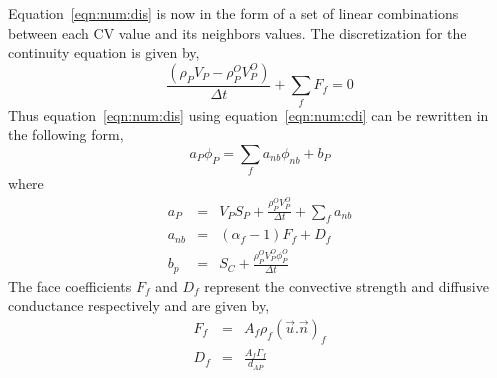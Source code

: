 Equation~\eqref{eqn:num:dis} is now in the form of a set of linear combinations between
each CV value and its neighbors values.
The discretization for the continuity equation is given by,
\begin{equation}
\frac{(\rho_P V_P-\rho_P^O V_P^O)}{\Delta t}+\sum_f F_f = 0
\label{eqn:num:cdi}
\end{equation}
Thus equation~\eqref{eqn:num:dis} using equation~\eqref{eqn:num:cdi} can be rewritten
in the following form,
\begin{equation}
a_P \phi_P = \sum_f a_{nb} \phi_{nb} + b_P
\label{eqn:num:dap}
\end{equation}
where
\begin{eqnarray}
a_P & = & V_P S_P + \frac{\rho_P^O V_P^O}{\Delta t} + \sum_f a_{nb} \\
a_{nb} & = & ( \alpha_f - 1 ) F_f + D_f \\
b_p & = & S_C + \frac{\rho_P^O V_P^O \phi_P^O}{\Delta t} 
\end{eqnarray}
The face coefficients $F_f$ and $D_f$ represent the convective strength
and diffusive conductance respectively and are given by,
\begin{eqnarray}
F_f & = & A_f \rho_f ( \vec{u}.\vec{n} )_f \\
D_f & = & \frac{A_f \Gamma_f}{d_{AP}} 
\end{eqnarray}












